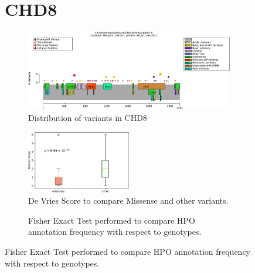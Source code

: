 \begin{figure}[htbp]
\section*{CHD8}
\centering
\begin{subfigure}[b]{0.95\textwidth}
\centering
\includegraphics[width=\textwidth]{ img/CHD8_protein_diagram.pdf} 
\captionsetup{justification=raggedright,singlelinecheck=false}
\caption{Distribution of variants in CHD8}
\end{subfigure}

\vspace{2em}

\begin{subfigure}[b]{0.95\textwidth}
\centering
\includegraphics[width=0.5\textwidth]{img/CHD8_stats.pdf} 
\captionsetup{justification=raggedright,singlelinecheck=false}
\caption{De Vries Score to compare Missense and other variants.}
\end{subfigure}

\vspace{2em}

\begin{subfigure}[b]{0.95\textwidth}
\centering
{}
\captionsetup{justification=raggedright,singlelinecheck=false}
\caption{Fisher Exact Test performed to compare HPO annotation frequency with respect to genotypes.}
\end{subfigure}
\end{figure}

